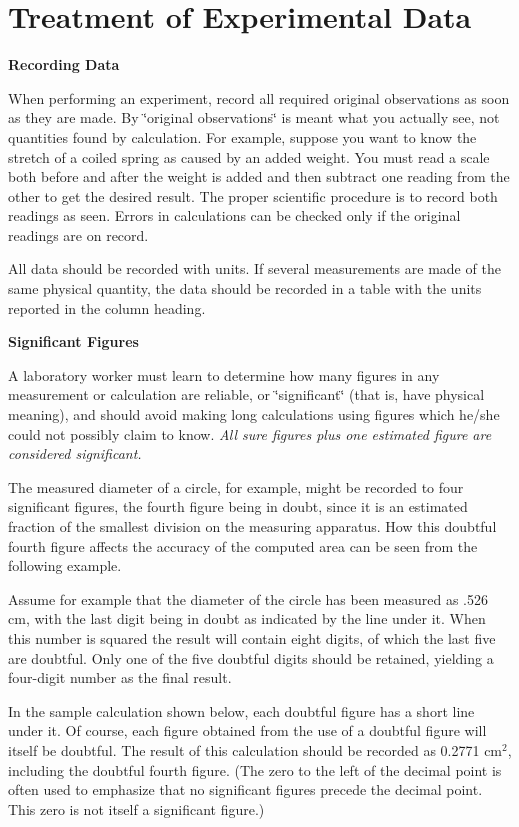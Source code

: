\section{Treatment of Experimental Data}

\textbf{Recording Data }

When performing an experiment, record all required original observations
as soon as they are made. By \char`\"{}original observations\char`\"{}
is meant what you actually see, not quantities found by calculation.
For example, suppose you want to know the stretch of a coiled spring
as caused by an added weight. You must read a scale both before and
after the weight is added and then subtract one reading from the other
to get the desired result. The proper scientific procedure is to record
both readings as seen. Errors in calculations can be checked only
if the original readings are on record.

All data should be recorded with units. If several measurements are
made of the same physical quantity, the data should be recorded in
a table with the units reported in the column heading.

\textbf{Significant Figures} 

A laboratory worker must learn to determine how many figures in any
measurement or calculation are reliable, or \char`\"{}significant\char`\"{}
(that is, have physical meaning), and should avoid making long calculations
using figures which he/she could not possibly claim to know. \textit{All
sure figures plus one estimated figure are considered significant.}

The measured diameter of a circle, for example, might be recorded
to four significant figures, the fourth figure being in doubt, since
it is an estimated fraction of the smallest division on the measuring
apparatus. How this doubtful fourth figure affects the accuracy of
the computed area can be seen from the following example.

Assume for example that the diameter of the circle has been measured
as .526 cm, with the last digit being in doubt as indicated by the
line under it. When this number is squared the result will contain
eight digits, of which the last five are doubtful. Only one of the
five doubtful digits should be retained, yielding a four-digit number
as the final result.

In the sample calculation shown below, each doubtful figure has a
short line under it. Of course, each figure obtained from the use
of a doubtful figure will itself be doubtful. The result of this calculation
should be recorded as 0.2771 cm\( ^{2} \), including the doubtful
fourth figure. (The zero to the left of the decimal point is often
used to emphasize that no significant figures precede the decimal
point. This zero is not itself a significant figure.)

